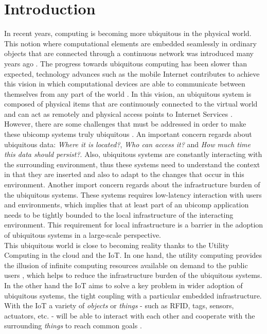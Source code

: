 
\chapter{Introduction}
\label{chapter:introduction}
In recent years, computing is becoming more ubiquitous in the physical world. This notion where
computational elements are embedded seamlessly in ordinary objects that are connected through a
continuous network was introduced many years ago \cite{weiser1991computer}. The progress
towards ubiquitous computing has been slower than expected, technology advances such as the mobile
Internet contributes to achieve this vision in which computational devices are able to communicate
between themselves from any part of the world \cite{gubbi2013internet}. In this vision, an ubiquitous
system is composed of physical items that are continuously connected to the virtual world and can act as
remotely and physical access points to Internet Services \cite{mattern2010internet}.\\

However, there are some challenges that must be addressed in order to make these \gls{ubicomp} systems
truly ubiquitous \cite{caceres2012ubicomp}. An important concern regards about ubiquitous data: \textit{Where it is located?},
\textit{Who can access it?} and \textit{How much time this data should persist?}. Also, ubiquitous systems
are constantly interacting with the surrounding environment, thus these systems need to understand
the context in that they are inserted and also to adapt to the changes that occur in this environment.
Another import concern regards about the infrastructure burden of the ubiquitous systems. These
systems requires low-latency interaction with users and environments, which implies that at least part
of an \gls{ubicomp} application needs to be tightly bounded to the local infrastructure of the interacting
environment. This requirement for local infrastructure is a barrier in the adoption of ubiquitous
systems in a large-scale perspective.\\

This ubiquitous world is close to becoming reality thanks to the Utility Computing in the cloud
and the \gls{IoT}. In one hand, the utility computing provides the illusion of infinite computing
resources available on demand to the public users \cite{armbrust2010view}, which helps to reduce the
infrastructure burden of the ubiquitous systems. In the other hand the \gls{IoT} aims to solve a key
problem in wider adoption of ubiquitous systems, the tight coupling with a particular embedded
infrastructure. With the \gls{IoT} a variety of \textit{objects} or \textit{things} - such as \gls{RFID},
tags, sensors, actuators, etc. - will be able to interact with each other and cooperate with the
surrounding \textit{things} to reach common goals \cite{atzori2010internet}.\\


